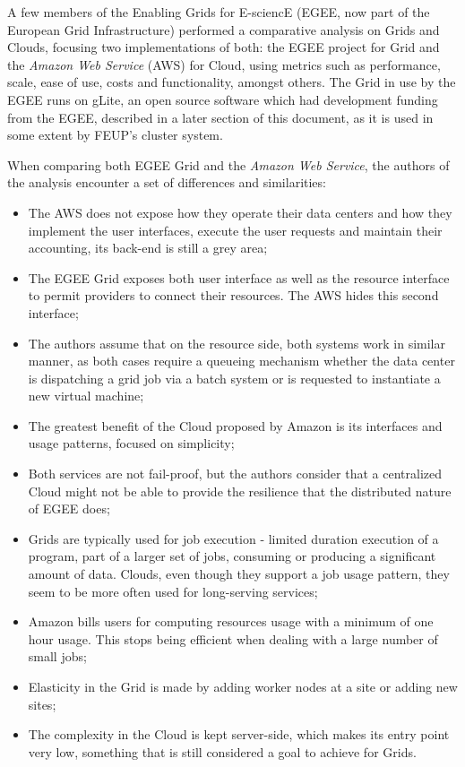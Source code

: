 A few members of the Enabling Grids for E-sciencE (EGEE, now part of the European Grid Infrastructure) performed a comparative analysis on Grids and Clouds, focusing two implementations of both: the EGEE project for Grid and the \textit{Amazon Web Service} (AWS) for Cloud, using metrics such as performance, scale, ease of use, costs and functionality, amongst others. The Grid in use by the EGEE runs on gLite, an open source software which had development funding from the EGEE, described in a later section of this document, as it is used in some extent by FEUP's cluster system.

When comparing both EGEE Grid and the \textit{Amazon Web Service}, the authors of the analysis encounter a set of differences and similarities:
\begin{itemize}
\item The AWS does not expose how they operate their data centers and how they implement the user interfaces, execute the user requests and maintain their accounting, its back-end is still a grey area;
\item The EGEE Grid exposes both user interface as well as the resource interface to permit providers to connect their resources. The AWS hides this second interface;
\item The authors assume that on the resource side, both systems work in similar manner, as both cases require a queueing mechanism whether the data center is dispatching a grid job via a batch system or is requested to instantiate a new virtual machine;
\item The greatest benefit of the Cloud proposed by Amazon is its interfaces and usage patterns, focused on simplicity;
\item Both services are not fail-proof, but the authors consider that a centralized Cloud might not be able to provide the resilience that the distributed nature of EGEE does;
\item Grids are typically used for job execution - limited duration execution of a program, part of a larger set of jobs, consuming or producing a significant amount of data. Clouds, even though they support a job usage pattern, they seem to be more often used for long-serving services;
\item Amazon bills users for computing resources usage with a minimum of one hour usage. This stops being efficient when dealing with a large number of small jobs;
\item Elasticity in the Grid is made by adding worker nodes at a site or adding new sites;
\item The complexity in the Cloud is kept server-side, which makes its entry point very low, something that is still considered a goal to achieve for Grids. \cite{grids-and-clouds}
\end{itemize}


